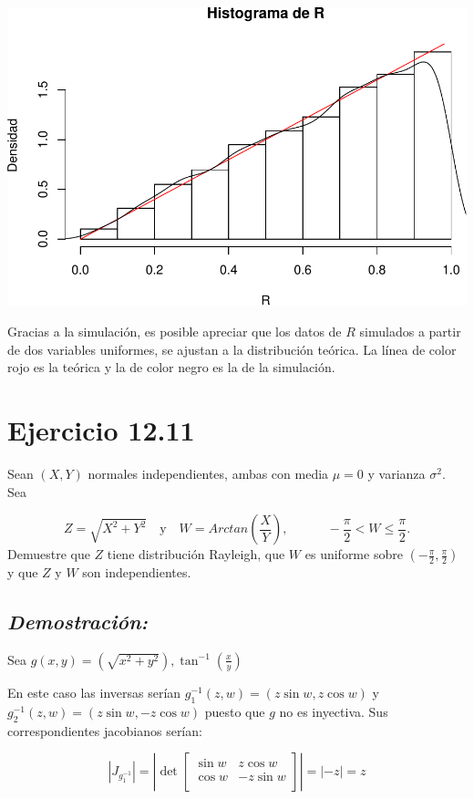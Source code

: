 \documentclass[]{article}
\begin{document}
\includegraphics[width=0.75\linewidth]{notebook_simulaciones_files/figure-latex/unnamed-chunk-1-1}

Gracias a la simulación, es posible apreciar que los datos de \(R\)
simulados a partir de dos variables uniformes, se ajustan a la
distribución teórica. La línea de color rojo es la teórica y la de color
negro es la de la simulación.

\section{Ejercicio 12.11}\label{ejercicio-12.11}

Sean \((X, Y)\) normales independientes, ambas con media \(\mu=0\) y
varianza \(\sigma^2\). Sea

\[
Z = \sqrt{X^2 + Y^2} \quad \text{y}\quad W=Arctan\left(\frac{X}{Y}\right), \quad\quad\quad-\frac{\pi}{2}<W\leq\frac{\pi}{2}.
\] Demuestre que \(Z\) tiene distribución Rayleigh, que \(W\) es
uniforme sobre \(\left(-\frac{\pi}{2},\frac{\pi}{2} \right)\) y que
\(Z\) y \(W\) son independientes.

\newpage

\subsection{\texorpdfstring{\emph{Demostración:}}{Demostración:}}\label{demostracion-1}

Sea
\(g(x,y)=\left(\sqrt{x^2+y^2}\right), \tan^{-1}\left(\frac{x}{y}\right)\)

En este caso las inversas serían \(g_1^{-1}(z,w)=(z\sin w,z\cos w)\) y
\(g_2^{-1}(z,w)=(z\sin w,-z\cos w)\) puesto que \(g\) no es inyectiva.
Sus correspondientes jacobianos serían:

\begin{equation}
\left| J_{g_1^{-1}}  \right|
=\left| \det 
\begin{bmatrix} 
\sin w &  z\cos w \\
\cos w &  -z\sin w \\
\end{bmatrix}  \right|
=|-z|=z
\end{equation}
\end{document}
